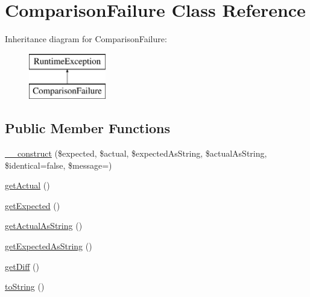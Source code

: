 \hypertarget{class_sebastian_bergmann_1_1_comparator_1_1_comparison_failure}{}\section{Comparison\+Failure Class Reference}
\label{class_sebastian_bergmann_1_1_comparator_1_1_comparison_failure}
Inheritance diagram for Comparison\+Failure\+:\begin{figure}[H]
\begin{center}
\leavevmode
\includegraphics[height=2.000000cm]{class_sebastian_bergmann_1_1_comparator_1_1_comparison_failure}
\end{center}
\end{figure}
\subsection*{Public Member Functions}
\begin{DoxyCompactItemize}
\item 
\mbox{\hyperlink{class_sebastian_bergmann_1_1_comparator_1_1_comparison_failure_aa44a2a8cd15cf8a931e0c7b57f21c9af}{\+\_\+\+\_\+construct}} (\$expected, \$actual, \$expected\+As\+String, \$actual\+As\+String, \$identical=false, \$message=\textquotesingle{}\textquotesingle{})
\item 
\mbox{\hyperlink{class_sebastian_bergmann_1_1_comparator_1_1_comparison_failure_aaa5fd2e00cca33da9587d232852545e2}{get\+Actual}} ()
\item 
\mbox{\hyperlink{class_sebastian_bergmann_1_1_comparator_1_1_comparison_failure_a54b748be99bc5dfaa0492e2a61be3ba0}{get\+Expected}} ()
\item 
\mbox{\hyperlink{class_sebastian_bergmann_1_1_comparator_1_1_comparison_failure_ab09e29f8ddeed4eabcee0c23ced08947}{get\+Actual\+As\+String}} ()
\item 
\mbox{\hyperlink{class_sebastian_bergmann_1_1_comparator_1_1_comparison_failure_ae084394e43a51ce1d3b08ff26bff32ab}{get\+Expected\+As\+String}} ()
\item 
\mbox{\hyperlink{class_sebastian_bergmann_1_1_comparator_1_1_comparison_failure_ab91c9dd4e98667ed868dd8f18b29ff3e}{get\+Diff}} ()
\item 
\mbox{\hyperlink{class_sebastian_bergmann_1_1_comparator_1_1_comparison_failure_a5558c5d549f41597377fa1ea8a1cefa3}{to\+String}} ()
\end{DoxyCompactItemize}
